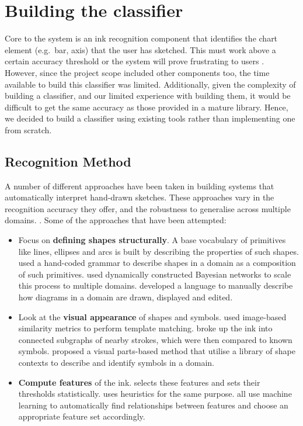 	\section{Building the classifier}	
	Core to the system is an ink recognition component that identifies the chart element (e.g.\ bar, axis) that the user has sketched. This must work above a certain accuracy threshold or the system will prove frustrating to users \citep{frankish_recognition_1995}. However, since the project scope included other components too, the time available to build this classifier was limited. Additionally, given the complexity of building a classifier, and our limited experience with building them, it would be difficult to get the same accuracy as those provided in a mature library. Hence, we decided to build a classifier using existing tools rather than implementing one from scratch. 
	
	\subsection{Recognition Method}
	A number of different approaches have been taken in building systems that automatically interpret hand-drawn sketches. These approaches vary in the recognition accuracy they offer, and the robustness to generalise across multiple domains. \citep{ouyang_visual_2009}. Some of the approaches that have been attempted:
	
	\begin{itemize}
		\item Focus on \textbf{defining shapes structurally}. A base vocabulary of primitives like lines, ellipses and arcs is built by describing the properties of such shapes. \citep{shilman_statistical_2002} used a hand-coded grammar to describe shapes in a domain as a composition of such primitives. \citep{alvarado_sketchread:_2004} used dynamically constructed Bayesian networks to scale this process to multiple domains. \citep{hammond_ladder:_2006} developed a language to manually describe how diagrams in a domain are drawn, displayed and edited. 
		\item Look at the \textbf{visual appearance} of shapes and symbols. \citep{kara_image-based_2004} used image-based similarity metrics to perform template matching. \citep{shilman_recognition_2004} broke up the ink into connected subgraphs of nearby strokes, which were then compared to known symbols. \citep{oltmans_envisioning_2007} proposed a visual parts-based method that utilise a library of shape contexts to describe and identify symbols in a domain.
		\item \textbf{Compute features} of the ink. \citep{patel_ink_2007} selects these features and sets their thresholds statistically. \citep{yu_domain-independent_2003} uses heuristics for the same purpose. \citep{chang_rata._2010,  rubine_specifying_1991, willems_iconic_2009} all use machine learning to automatically find relationships between features and choose an appropriate feature set accordingly.
	\end{itemize}		
	
